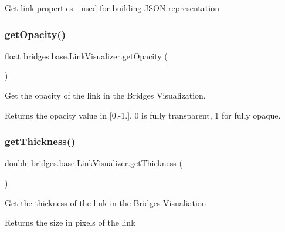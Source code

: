 Get link properties -\/ used for building J\+S\+ON representation \mbox{\label{classbridges_1_1base_1_1_link_visualizer_a07cdd435a54e4b612ad63614f2a27a4a}} 
\subsubsection{\texorpdfstring{getOpacity()}{getOpacity()}}
{\footnotesize\ttfamily float bridges.\+base.\+Link\+Visualizer.\+get\+Opacity (\begin{DoxyParamCaption}{ }\end{DoxyParamCaption})}



Get the opacity of the link in the Bridges Visualization. 

\begin{DoxyReturn}{Returns}
the opacity value in \mbox{[}0.-\/1.\mbox{]}. 0 is fully transparent, 1 for fully opaque. 
\end{DoxyReturn}
\mbox{\label{classbridges_1_1base_1_1_link_visualizer_af1592d2a8664b00c1a51fdc0f8d1860a}} 
\subsubsection{\texorpdfstring{getThickness()}{getThickness()}}
{\footnotesize\ttfamily double bridges.\+base.\+Link\+Visualizer.\+get\+Thickness (\begin{DoxyParamCaption}{ }\end{DoxyParamCaption})}

Get the thickness of the link in the Bridges Visualiation

\begin{DoxyReturn}{Returns}
the size in pixels of the link 
\end{DoxyReturn}
\mbox{\label{classbridges_1_1base_1_1_link_visualizer_a92f306dbd73b961befa8ab4c0620a89e}} 

